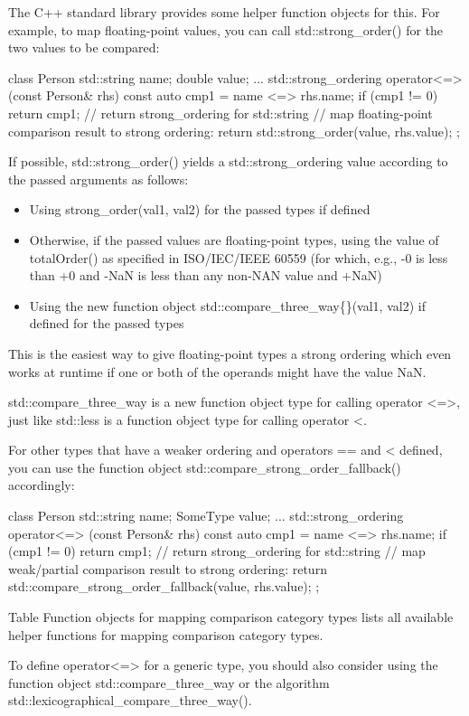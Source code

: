 The C++ standard library provides some helper function objects for this. For example, to map floating-point values, you can call std::strong\_order() for the two values to be compared:

\begin{cpp}
class Person {
	std::string name;
	double value;
	...
	std::strong_ordering operator<=> (const Person& rhs) const {
		auto cmp1 = name <=> rhs.name;
		if (cmp1 != 0) return cmp1; // return strong_ordering for std::string
		// map floating-point comparison result to strong ordering:
		return std::strong_order(value, rhs.value);
	}
};
\end{cpp}

If possible, std::strong\_order() yields a std::strong\_ordering value according to the passed arguments as follows:

\begin{itemize}
\item
Using strong\_order(val1, val2) for the passed types if defined

\item
Otherwise, if the passed values are floating-point types, using the value of totalOrder() as specified in ISO/IEC/IEEE 60559 (for which, e.g., -0 is less than +0 and -NaN is less than any non-NAN value and +NaN)

\item
Using the new function object std::compare\_three\_way\{\}(val1, val2) if defined for the passed types
\end{itemize}

This is the easiest way to give floating-point types a strong ordering which even works at runtime if one or both of the operands might have the value NaN.

std::compare\_three\_way is a new function object type for calling operator <=>, just like std::less is a function object type for calling operator <.

For other types that have a weaker ordering and operators == and < defined, you can use the function object std::compare\_strong\_order\_fallback() accordingly:

\begin{cpp}
class Person {
	std::string name;
	SomeType value;
	...
	std::strong_ordering operator<=> (const Person& rhs) const {
		auto cmp1 = name <=> rhs.name;
		if (cmp1 != 0) return cmp1; // return strong_ordering for std::string
		// map weak/partial comparison result to strong ordering:
		return std::compare_strong_order_fallback(value, rhs.value);
	}
};
\end{cpp}

Table Function objects for mapping comparison category types lists all available helper functions for mapping comparison category types.

To define operator<=> for a generic type, you should also consider using the function object std::compare\_three\_way or the algorithm std::lexicographical\_compare\_three\_way().
